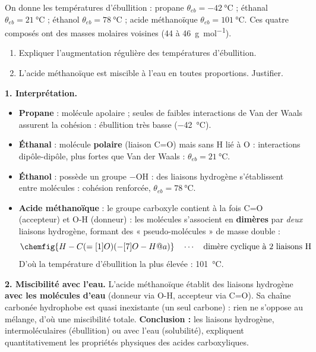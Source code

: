 \documentclass[11pt]{article}
\newcommand{\cle}[1]{{\popxbold\color{popdark}#1}}
\begin{document}
\begin{exoresolu}
On donne les températures d'ébullition : propane $\theta_{eb} = \SI{-42}{\celsius}$ ; éthanal $\theta_{eb} = \SI{21}{\celsius}$ ; éthanol $\theta_{eb} = \SI{78}{\celsius}$ ; acide méthanoïque $\theta_{eb} = \SI{101}{\celsius}$. Ces quatre composés ont des masses molaires voisines (44 à \SI{46}{g.mol^{-1}}).
\begin{enumerate}
\item Expliquer l'augmentation régulière des températures d'ébullition.
\item L'acide méthanoïque est miscible à l'eau en toutes proportions. Justifier.
\end{enumerate}
\tcblower
\textbf{1. Interprétation.}
\begin{itemize}
\item \textbf{Propane}  : molécule apolaire ; seules de faibles interactions de Van der Waals assurent la cohésion : ébullition très basse (\SI{-42}{\celsius}).
\item \textbf{Éthanal}  : molécule \textbf{polaire} (liaison C=O) mais sans H lié à O : interactions dipôle-dipôle, plus fortes que Van der Waals : $\theta_{eb} = \SI{21}{\celsius}$.
\item \textbf{Éthanol}  : possède un groupe $-\mathrm{OH}$ : des \cle{liaisons hydrogène} s'établissent entre molécules : cohésion renforcée, $\theta_{eb} = \SI{78}{\celsius}$.
\item \textbf{Acide méthanoïque}  : le groupe carboxyle contient à la fois C=O (accepteur) et O-H (donneur) : les molécules s'associent en \textbf{dimères} par \emph{deux} liaisons hydrogène, formant des « pseudo-molécules » de masse double :
\[ \chemfig{H-C(=[1]O)(-[7]O-H@{a})} \quad \cdots \quad \text{dimère cyclique à 2 liaisons H} \]
D'où la température d'ébullition la plus élevée : \SI{101}{\celsius}.
\end{itemize}
\textbf{2. Miscibilité avec l'eau.} L'acide méthanoïque établit des liaisons hydrogène \textbf{avec les molécules d'eau} (donneur via O-H, accepteur via C=O). Sa chaîne carbonée hydrophobe est quasi inexistante (un seul carbone) : rien ne s'oppose au mélange, d'où une miscibilité totale.
\textbf{Conclusion :} les liaisons hydrogène, intermoléculaires (ébullition) ou avec l'eau (solubilité), expliquent quantitativement les propriétés physiques des acides carboxyliques.
\end{exoresolu}
\end{document}
